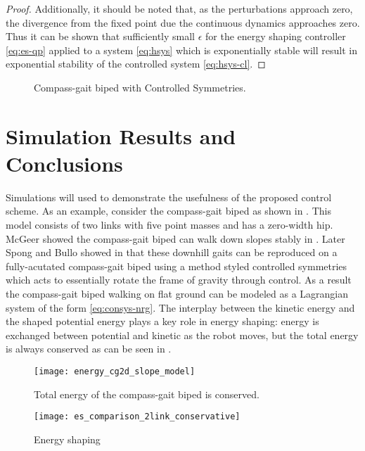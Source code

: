 \begin{proof}
  Additionally, it should be noted that, as the perturbations approach zero, the divergence from the fixed point due the continuous dynamics approaches zero.
  Thus it can be shown that sufficiently small $\epsilon$ for the energy shaping controller \eqref{eq:es-qp} applied to a system \eqref{eq:hsys} which is exponentially stable will result in exponential stability of the controlled system \eqref{eq:hsys-cl}.
\end{proof}

\begin{figure}
  \centering
  \def\svgwidth{0.5\columnwidth}
  
  \caption{Compass-gait biped with Controlled Symmetries.}
  \label{fig:cg2d-model}
\end{figure}

\section*{Simulation Results and Conclusions}

Simulations will used to demonstrate the usefulness of the proposed control scheme.
%
As an example, consider the compass-gait biped as shown in .
%
This model consists of two links with five point masses and has a zero-width hip.
%
McGeer showed the compass-gait biped can walk down slopes stably in \cite{McGeer90}.
%
Later Spong and Bullo showed in \cite{SB02} that these downhill gaits can be reproduced on a fully-acutated compass-gait biped using a method styled controlled symmetries which acts to essentially rotate the frame of gravity through control.
%
As a result the compass-gait biped walking on flat ground can be modeled as a Lagrangian system of the form \eqref{eq:consys-nrg}.
%
The interplay between the kinetic energy and the shaped potential energy plays a key role in energy shaping: energy is exchanged between potential and kinetic as the robot moves, but the total energy is always conserved as can be seen in .


\begin{figure}
  \centering
  \texttt{[image: energy\_cg2d\_slope\_model]}
  \caption{Total energy of the compass-gait biped is conserved.}
  \label{fig:nrg-cons}
\end{figure}

\begin{figure}
  \centering
  \texttt{[image: es\_comparison\_2link\_conservative]}
  \caption{Energy shaping}
  \label{fig:nrg-comp}
\end{figure}



